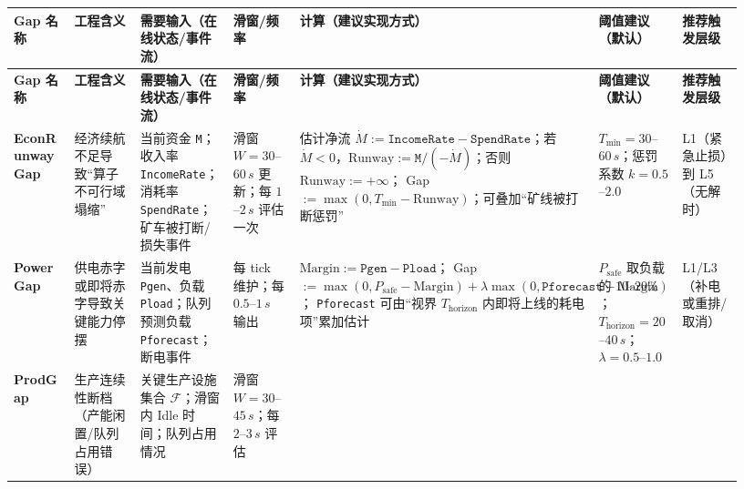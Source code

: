 \documentclass[12pt]{article}
\begin{document}
\begin{CJK*}{UTF8}{gkai}
\begingroup
\scriptsize
\setlength{\tabcolsep}{2pt}
\renewcommand{\arraystretch}{1.2}
\setlength{\LTleft}{0pt}
\setlength{\LTright}{0pt}
\begin{longtable}{|
  >{\raggedright\arraybackslash}p{0.10\linewidth}|
  >{\raggedright\arraybackslash}p{0.11\linewidth}|
  >{\raggedright\arraybackslash}p{0.16\linewidth}|
  >{\raggedright\arraybackslash}p{0.10\linewidth}|
  >{\raggedright\arraybackslash}p{0.24\linewidth}|
  >{\raggedright\arraybackslash}p{0.12\linewidth}|
  >{\raggedright\arraybackslash}p{0.10\linewidth}|}
\hline
\textbf{Gap 名称} & \textbf{工程含义} & \textbf{需要输入（在线状态/事件流）} & \textbf{滑窗/频率} & \textbf{计算（建议实现方式）} & \textbf{阈值建议（默认）} &
  \textbf{推荐触发层级} \\
\hline
\endfirsthead
\hline
\textbf{Gap 名称} & \textbf{工程含义} & \textbf{需要输入（在线状态/事件流）} & \textbf{滑窗/频率} & \textbf{计算（建议实现方式）} & \textbf{阈值建议（默认）} &
  \textbf{推荐触发层级} \\
\hline
\endhead
\textbf{Econ\allowbreak Runway\allowbreak Gap}
& 经济续航不足导致“算子不可行域塌缩”
& 当前资金 \texttt{M}；收入率 \texttt{IncomeRate}；消耗率 \texttt{SpendRate}；矿车被打断/损失事件
& 滑窗 $W=30$--$60\,s$ 更新；每 $1$--$2\,s$ 评估一次
& 估计净流 $\dot M:=\texttt{IncomeRate}-\texttt{SpendRate}$；若 $\dot M<0$，$\mathrm{Runway}:=\texttt{M}/(-\dot M)$；否则
  $\mathrm{Runway}:=+\infty$；
\newline Gap $:=\max(0,T_{\min}-\mathrm{Runway})$；可叠加“矿线被打断惩罚”
& $T_{\min}=30$--$60\,s$；惩罚系数 $k=0.5$--$2.0$
& L1（紧急止损）到 L5（无解时）
\\ \hline
\textbf{PowerGap}
& 供电赤字或即将赤字导致关键能力停摆
& 当前发电 \texttt{Pgen}、负载 \texttt{Pload}；队列预测负载 \texttt{Pforecast}；断电事件
& 每 tick 维护；每 $0.5$--$1\,s$ 输出
& $\mathrm{Margin}:=\texttt{Pgen}-\texttt{Pload}$；
\newline Gap $:=\max(0,P_{\mathrm{safe}}-\mathrm{Margin})+\lambda\max(0,\texttt{Pforecast}-\mathrm{Margin})$；
\newline \texttt{Pforecast} 可由“视界 $T_{\mathrm{horizon}}$ 内即将上线的耗电项”累加估计
& $P_{\mathrm{safe}}$ 取负载的 $10$--$20\%$；
\newline $T_{\mathrm{horizon}}=20$--$40\,s$；$\lambda=0.5$--$1.0$
& L1/L3（补电或重排/取消）
\\ \hline
\textbf{ProdGap}
& 生产连续性断档（产能闲置/队列占用错误）
& 关键生产设施集合 $\mathcal{F}$；滑窗内 Idle 时间；队列占用情况
& 滑窗 $W=30$--$45\,s$；每 $2$--$3\,s$ 评估

\end{longtable}
\end{CJK*}
\end{document}
